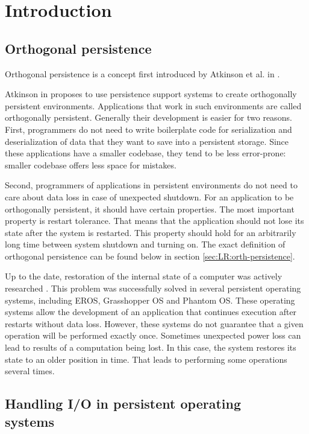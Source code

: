 \chapter{Introduction}
\section{Orthogonal persistence}
Orthogonal persistence is a concept first introduced by Atkinson et al. in 
\cite{atkinson1983ps}. 

Atkinson in \cite{atkinson1995orthogonally} proposes to use persistence support
systems to create orthogonally persistent environments. Applications that work
in such environments are called orthogonally persistent. Generally their
development is easier for two reasons. First, programmers do not need to write
boilerplate code for serialization and deserialization of data that they want
to save into a persistent storage. Since these applications have a smaller
codebase, they tend to be less error-prone: smaller codebase offers less space
for mistakes.

Second, programmers of applications in persistent environments do not need to
care about data loss in case of unexpected shutdown. For an application to be
orthogonally persistent, it should have certain properties. The most important
property is restart tolerance. That means that the application should not lose
its state after the system is restarted. This property should hold for an
arbitrarily long time between system shutdown and turning on. The exact
definition of orthogonal persistence can be found below in section
\ref{sec:LR:orth-persistence}.

Up to the date, restoration of the internal state of a computer was actively
researched
\cite{landau1992checkpoint,dearle1994grasshopper,ransford2014nonvolatile,lucia2015simpler}.
This problem was successfully solved in several persistent operating systems,
including EROS, Grasshopper OS and Phantom OS. These operating systems allow
the development of an application that continues execution after restarts
without data loss. However, these systems do not guarantee that a given
operation will be performed exactly once. Sometimes unexpected power loss can
lead to results of a computation being lost. In this case, the system restores
its state to an older position in time. That leads to performing some
operations several times.

\section{Handling I/O in persistent operating\\ systems}

